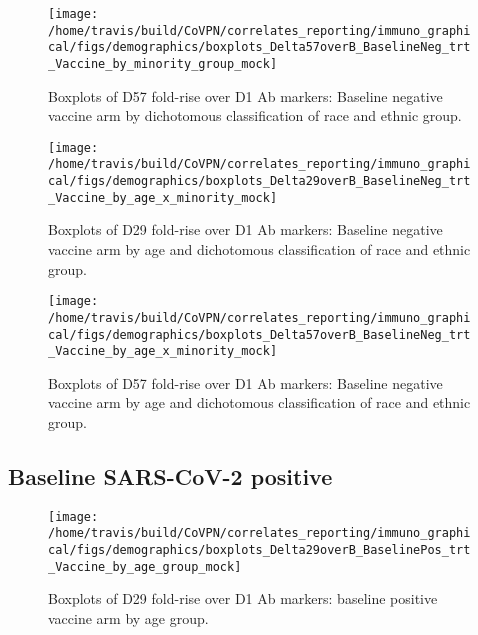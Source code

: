 \documentclass[]{book}
\theoremstyle{definition}
\theoremstyle{definition}
\theoremstyle{definition}
\newcommand{\1}{\mathbbm{1}}
\begin{document}
\clearpage
\begin{figure}[H]

{\centering \texttt{[image: /home/travis/build/CoVPN/correlates\_reporting/immuno\_graphical/figs/demographics/boxplots\_Delta57overB\_BaselineNeg\_trt\_Vaccine\_by\_minority\_group\_mock]} 

}

\caption{Boxplots of D57 fold-rise over D1 Ab markers: Baseline negative vaccine arm by dichotomous classification of race and ethnic group.}\label{fig:unnamed-chunk-159}
\end{figure}

\clearpage

\clearpage

\clearpage
\begin{figure}[H]

{\centering \texttt{[image: /home/travis/build/CoVPN/correlates\_reporting/immuno\_graphical/figs/demographics/boxplots\_Delta29overB\_BaselineNeg\_trt\_Vaccine\_by\_age\_x\_minority\_mock]} 

}

\caption{Boxplots of D29 fold-rise over D1 Ab markers: Baseline negative vaccine arm by age and dichotomous classification of race and ethnic group.}\label{fig:unnamed-chunk-162}
\end{figure}

\clearpage
\begin{figure}[H]

{\centering \texttt{[image: /home/travis/build/CoVPN/correlates\_reporting/immuno\_graphical/figs/demographics/boxplots\_Delta57overB\_BaselineNeg\_trt\_Vaccine\_by\_age\_x\_minority\_mock]} 

}

\caption{Boxplots of D57 fold-rise over D1 Ab markers: Baseline negative vaccine arm by age and dichotomous classification of race and ethnic group.}\label{fig:unnamed-chunk-163}
\end{figure}

\clearpage

\hypertarget{baseline-sars-cov-2-positive-5}{%
\subsection{Baseline SARS-CoV-2 positive}\label{baseline-sars-cov-2-positive-5}}

\clearpage

\clearpage
\begin{figure}[H]

{\centering \texttt{[image: /home/travis/build/CoVPN/correlates\_reporting/immuno\_graphical/figs/demographics/boxplots\_Delta29overB\_BaselinePos\_trt\_Vaccine\_by\_age\_group\_mock]} 

}

\caption{Boxplots of D29 fold-rise over D1 Ab markers: baseline positive vaccine arm by age group.}\label{fig:unnamed-chunk-166}
\end{figure}
\end{document}
